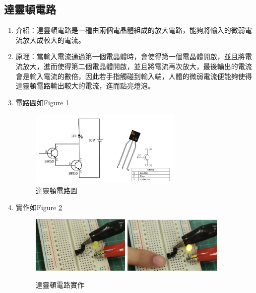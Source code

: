 \documentclass[12pt,a4paper]{article}
\begin{document}
\begin{CJK*}{UTF8}{bkai}
    \subsection{達靈頓電路}
    \begin{enumerate}
        \item 介紹：達靈頓電路是一種由兩個電晶體組成的放大電路，能夠將輸入的微弱電流放大成較大的電流。
        \item 原理：當輸入電流通過第一個電晶體時，會使得第一個電晶體開啟，並且將電流放大，進而使得第二個電晶體開啟，並且將電流再次放大，最後輸出的電流會是輸入電流的數倍，因此若手指觸碰到輸入端，人體的微弱電流便能夠使得達靈頓電路輸出較大的電流，進而點亮燈泡。
        \item 電路圖如Figure \ref{fig:darlington_circuit}
              \begin{figure}[h]
                  \centering
                  \includegraphics[width=0.7\textwidth]{./images/darlington_circuit.png}
                  \caption{達靈頓電路圖}
                  \label{fig:darlington_circuit}
              \end{figure}
        \item 實作如Figure \ref{fig:darlington}
              \begin{figure}[h]
                  \centering
                  \includegraphics[width=0.45\textwidth]{./images/darlington_1.png}
                  \includegraphics[width=0.45\textwidth]{./images/darlington_2.png}
                  \caption{達靈頓電路實作}
                  \label{fig:darlington}
              \end{figure}
    \end{enumerate}
    \newpage


\end{CJK*}
\end{document}
